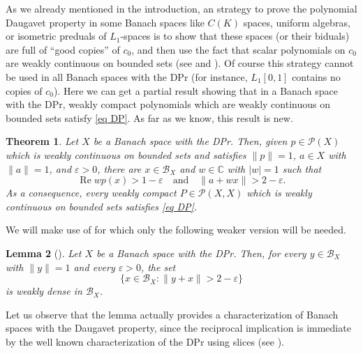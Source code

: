 \documentclass[10pt]{amsart}
\newtheorem{theorem}{Theorem}[section]
\newtheorem{lemma}[theorem]{Lemma}
\def\CC{{\mathbb{C}}}
\DeclareMathOperator{\re}{Re}
\begin{document}
	As we already mentioned in the introduction, an strategy to prove the polynomial Daugavet property in some Banach spaces like $C(K)$ spaces,  uniform algebras, or isometric preduals of $L_1$-spaces is to show that these spaces (or their biduals) are full of ``good copies'' of $c_0$, and then use the fact that scalar polynomials on $c_0$ are weakly continuous on bounded sets (see \cite[Proposition~6.3]{cgmm2} and \cite[Proposition~4.3]{MarRueda2022}). Of course this strategy cannot be used in all Banach spaces with the DPr (for instance, $L_1[0,1]$ contains no copies of $c_0$). Here we can get a partial result showing that in a Banach space with the DPr, weakly compact polynomials which are weakly continuous on bounded sets satisfy \eqref{eq DP}. As far as we know, this result is new.
	
	\begin{theorem}\label{prop:generalDPr-weaklycontinouspolynomials}
		Let $X$ be a Banach space with the DPr. Then, given $p\in \mathcal{P}(X)$ which is weakly continuous on bounded sets and satisfies $\|p\|=1$, $a\in X$ with $\|a\|=1$, and $\varepsilon>0$, there are $x\in \mathcal{B}_X$ and $w\in \CC$ with $|w|=1$ such that
		$$
		\re w p(x)>1-\varepsilon \quad \text{and} \quad \|a+ w x\|>2-\varepsilon.
		$$
		As a consequence, every weakly compact $P\in \mathcal{P}(X,X)$ which is weakly continuous on bounded sets satisfies \eqref{eq DP}.
	\end{theorem}
	
	We will make use of \cite[Lemma~3]{ShvydkoyJFA2000} for which only the following weaker version will be needed.
	
	\begin{lemma}[\textrm{\cite[Lemma~3]{ShvydkoyJFA2000}}]\label{lemma-Shvidkoy}
		Let $X$ be a Banach space with the DPr. Then, for every $y\in \mathcal{B}_X$ with $\|y\|=1$ and every $\varepsilon>0$, the set
		$$
		\{x\in \mathcal{B}_X\colon \|y+x\|>2-\varepsilon\}
		$$
		is weakly dense in $\mathcal{B}_X$.
	\end{lemma}
	
	Let us observe that the lemma actually provides a characterization of Banach spaces with the Daugavet property, since the reciprocal implication is immediate by the well known characterization of the DPr using slices (see \cite[Lemma~2.1]{kssw}).
	
\end{document}
